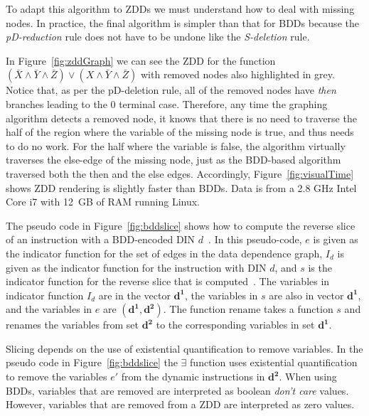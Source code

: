 {To adapt this algorithm to ZDDs we must understand how to deal with missing nodes.  In practice, the final algorithm is simpler than that for BDDs because the \textit{pD-reduction} rule does not have to be undone like the \textit{S-deletion} rule.

In Figure~\ref{fig:zddGraph} we can see the ZDD for the function $(\bar{X}\land\bar{Y}\land\bar{Z})\lor(X\land\bar{Y}\land\bar{Z})$ with removed nodes also highlighted in grey.  Notice that, as per the pD-deletion rule, all of the removed nodes have \textit{then} branches leading to the $0$ terminal case. Therefore, any time the graphing algorithm detects a removed node, it knows that there is no need to traverse the half of the region where the variable of the missing node is true, and thus needs to do no work.  For the half where the variable is false, the algorithm virtually traverses the else-edge of the missing node, just as the BDD-based algorithm traversed both the then and the else edges. Accordingly, Figure~\ref{fig:visualTime} shows ZDD rendering is slightly faster than BDDs.  Data is from a 2.8 GHz Intel Core i7 with 12~GB of RAM running Linux. %

The pseudo code in Figure~\ref{fig:bddslice} shows how to compute the reverse slice of an instruction with a BDD-encoded DIN $d$~\cite{price:06:cal}.  In this pseudo-code, $e$ is given as the indicator function for the set of edges in the data dependence graph, $I_d$ is given as the indicator function for the instruction with DIN $d$, and $s$ is the indicator function for the reverse slice that is computed~\cite{price:06:cal}.  The variables in indicator function $I_d$ are in the vector $\mathbf{d^1}$, the variables in $s$ are also in vector $\mathbf{d^1}$, and the variables in $e$ are $(\mathbf{d^1},\mathbf{d^2})$.  The function $\mathrm{rename}$ takes a function $s$ and renames the variables from set $\mathbf{d^2}$ to the corresponding variables in set $\mathbf{d^1}$.

Slicing depends on the use of existential quantification to remove variables. In the pseudo code in Figure~\ref{fig:bddslice} the $\exists$ function uses existential quantification to remove the variables $e'$ from the dynamic instructions in $\mathbf{d^2}$.  When using BDDs, variables that are removed are interpreted as boolean \textit{don't care} values.  However, variables that are removed from a ZDD are interpreted as zero values.

}
